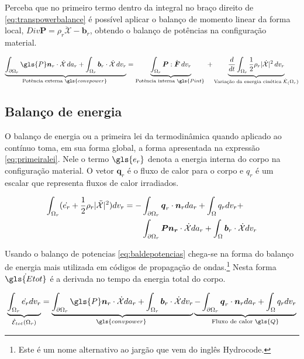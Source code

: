 Perceba que no primeiro termo dentro da integral no braço direito de  \ref{eq:transpowerbalance} é possível aplicar o balanço de momento linear da forma local, $ Div \boldsymbol{P} = \rho_r \ddot{\mathcal{X}} - \boldsymbol{b}_r $, obtendo o balanço de potências na configuração material. 

\begin{equation} \label{eq:baldepotencias}
     \underbrace{\int_{\partial \Omega_r} \gls{P}\boldsymbol{n}_r \cdot \dot{\mathcal{X}} \,da_r + \int_{\Omega_r} \boldsymbol{b}_r \cdot \dot{\mathcal{X}} \,dv_r}_\text{Potência externa $\gls{convpower}$ } = \underbrace{\int_{\Omega_r} \boldsymbol{P}: \dot{\boldsymbol{F}} \,dv_r}_\text{Potência interna $\gls{Pint}$ } + \underbrace{\frac{d}{dt} \int_{\Omega_r} \frac{1}{2}\rho_r |\dot{\mathcal{X}}|^2 \,dv_r}_\text{Variação da energia cinética $\dot{\mathcal{K}}_(\Omega_r)$} 
\end{equation}

\subsection{Balanço de energia}

O balanço de energia ou a primeira lei da termodinâmica quando aplicado ao contínuo toma, em sua forma global, a forma apresentada na expressão \ref{eq:primeiralei}. Nele o termo $ \gls{e_r} $ denota a energia interna do corpo na configuração material. O vetor $\boldsymbol{q}_r$ é o fluxo de calor para o corpo e $q_r$ é um escalar que representa fluxos de calor irradiados.

\begin{align}  \label{eq:primeiralei}
  \int_{\Omega_r} (\dot{e_r} + \frac{1}{2} \rho_r|\ddot{\mathcal{X}}|^2) dv_r = -&\int_{\partial \Omega_r} \boldsymbol{q}_r \cdot \boldsymbol{n}_r da_r + \int_{\Omega} q_r dv_r + \\ \notag 
    &\int_{\partial \Omega_r} \boldsymbol{Pn_r} \cdot \dot{\mathcal{X}} da_r + \int_{\Omega} \boldsymbol{b}_r \cdot \dot{\mathcal{X}} dv_r
\end{align}

Usando o balanço de potencias \ref{eq:baldepotencias} chega-se na forma do balanço de energia mais utilizada em códigos de propagação de ondas.\footnote{Este é um nome alternativo ao jargão que vem do inglês Hydrocode.} Nesta forma $\dot{\gls{Etot}}$ é a derivada no tempo da energia total do corpo.

\begin{equation} \label{eq:balenergia}
    \underbrace{\int_{\Omega_r} \dot{e_r} dv_r}_\text{$\dot{\mathcal{E}}_{tot}(\Omega_r)$} = \underbrace{\int_{\partial \Omega_r} \gls{P}\boldsymbol{n}_r \cdot \dot{\mathcal{X}} da_r + \int_{\Omega_r} \boldsymbol{b}_r \cdot \dot{\mathcal{X}} dv_r}_\text{$\gls{convpower}$ } \underbrace{-\int_{\partial \Omega_r} \boldsymbol{q}_r \cdot \boldsymbol{n}_r da_r + \int_{\Omega} q_r dv_r}_\text{Fluxo de calor $ \gls{Q} $}
\end{equation}


